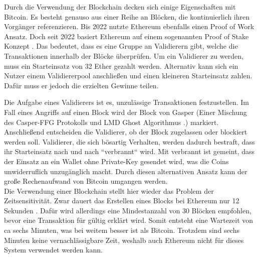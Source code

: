\documentclass{scrreprt}
\begin{document}
Durch die Verwendung der Blockchain decken sich einige Eigenschaften mit Bitcoin. Es besteht genauso aus einer Reihe an Blöcken, die kontinuierlich ihren Vorgänger referenzieren. Bis 2022 nutzte Ethereum ebenfalls einen Proof of Work Ansatz. Doch seit 2022 basiert Ethereum auf einem sogenannten Proof of Stake Konzept \cite{eth-explainerInvestopia}. Das bedeutet, dass es eine Gruppe an Validierern gibt, welche die Transaktionen innerhalb der Blöcke überprüfen. Um ein Validierer zu werden, muss ein Starteinsatz von 32 Ether gezahlt werden. Alternativ kann sich ein Nutzer einem Validiererpool anschließen und einen kleineren Starteinsatz zahlen. Dafür muss er jedoch die erzielten Gewinne teilen. 

Die Aufgabe eines Validierers ist es, unzulässige Transaktionen festzustellen. Im Fall eines Angriffs auf einen Block wird der Block von Gasper (Einer Mischung des Casper-FFG Protokolls und LMD Ghost Algorithmus \cite{eth-buterin2020combining}.) markiert. Anschließend entscheiden die Validierer, ob der Block zugelassen oder blockiert werden soll. Validierer, die sich bösartig Verhalten, werden dadurch bestraft, dass ihr Starteinsatz nach und nach ``verbrannt`` wird. Mit verbrannt ist gemeint, dass der Einsatz an ein Wallet ohne Private-Key gesendet wird, was die Coins unwiderruflich unzugänglich macht. Durch diesen alternativen Ansatz kann der große Rechenaufwand von Bitcoin umgangen werden.\\

Die Verwendung einer Blockchain stellt hier wieder das Problem der Zeitsensitivität. Zwar dauert das Erstellen eines Blocks bei Ethereum nur 12 Sekunden \cite{eth-timePerBlock}. Dafür wird allerdings eine Mindestanzahl von 30 Blöcken empfohlen, bevor eine Transaktion für gültig erklärt wird. Somit entsteht eine Wartezeit von ca sechs Minuten, was bei weitem besser ist als Bitcoin. Trotzdem sind sechs Minuten keine vernachlässigbare Zeit, weshalb auch Ethereum nicht für dieses System verwendet werden kann.
\end{document}
